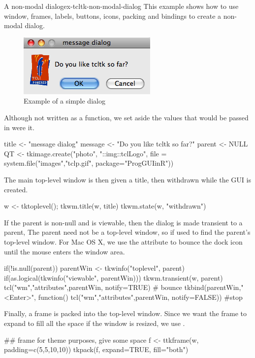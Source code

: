 \begin{example}{A non-modal dialog}{ex-tcltk-non-modal-dialog}
This example shows how to use  window, frames,  labels, buttons,
icons, packing and bindings to create a non-modal dialog. 

\begin{figure}
  \centering
  \includegraphics[width=.4\textwidth]{fig-tcltk-simple-dialog.png}
  \caption{Example of a simple dialog}
  \label{fig:fig-tcltk-simple-dialog}
\end{figure}

Although not written as a function, we set aside the values that would
be passed in were it.
\begin{Schunk}
\begin{Sinput}
 title <- "message dialog"
 message <- "Do you like tcltk so far?"
 parent <- NULL
 QT <- tkimage.create("photo", "::img::tclLogo", 
                      file = system.file("images","tclp.gif",
                        package="ProgGUIinR"))
\end{Sinput}
\end{Schunk}

The main top-level window is then given a title, then withdrawn while the GUI is created.
\begin{Schunk}
\begin{Sinput}
 w <- tktoplevel(); tkwm.title(w, title)
 tkwm.state(w, "withdrawn")
\end{Sinput}
\end{Schunk}

If the parent is non-null and is viewable, then the dialog is made
transient to a parent, The parent need not be a top-level window, so
 if used to find the parent's top-level window. For Mac OS X, we use the  attribute to bounce the dock icon until the mouse enters the window area.

\begin{Schunk}
\begin{Sinput}
 if(!is.null(parent)) {
   parentWin <- tkwinfo("toplevel", parent)
   if(as.logical(tkwinfo("viewable", parentWin))) {
     tkwm.transient(w, parent)
     tcl("wm","attributes",parentWin, notify=TRUE) # bounce
     tkbind(parentWin,"<Enter>", function() 
       tcl("wm","attributes",parentWin, notify=FALSE)) #stop
   }
 }
\end{Sinput}
\end{Schunk}
Finally, a frame is packed into the top-level window. Since we want the
frame to expand to fill all the space if the window is resized, we use .
\begin{Schunk}
\begin{Sinput}
 ## frame for theme purposes, give some space
 f <- ttkframe(w,  padding=c(5,5,10,10))
 tkpack(f, expand=TRUE, fill="both")
\end{Sinput}
\end{Schunk}


\end{example}
